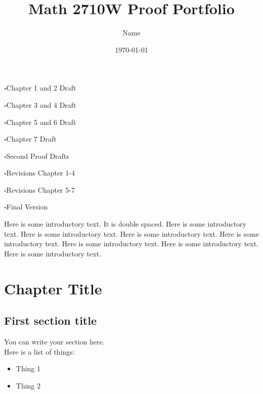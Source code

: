 \documentclass[12pt]{article} %
\title{Math 2710W Proof Portfolio}
\author{Name} %
\date{\today} %
\newcommand{\incomplete}{$\square$}
\theoremstyle{definition}
\begin{document}
\maketitle


\incomplete Chapter 1 and 2 Draft 

\incomplete Chapter 3 and 4 Draft

\incomplete Chapter 5 and 6 Draft 

\incomplete Chapter 7 Draft

\incomplete Second Proof Drafts 

\incomplete Revisions Chapter 1-4

\incomplete Revisions Chapter 5-7

\incomplete Final Version

\newpage %

\tableofcontents %

\newpage

\doublespacing
\noindent Here is some introductory text. It is double spaced. Here is some introductory text. Here is some introductory text. Here is some introductory text. Here is some introductory text. Here is some introductory text. Here is some introductory text. Here is some introductory text.



\section{Chapter Title}

\subsection{First section title}

You can write your section here.\\

Here is a list of things:

\begin{itemize} %
	\item Thing 1
	\item Thing 2
\end{itemize} %
\end{document}
